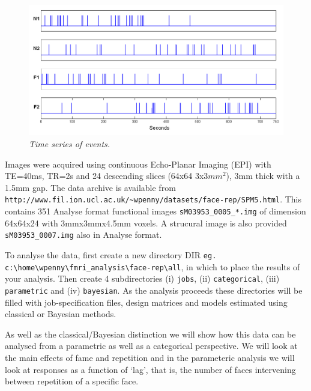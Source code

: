 \documentclass[a4paper,titlepage]{book}
\begin{document}
\begin{figure}
\begin{center}
\includegraphics[width=120mm]{faces/face_timing}
\caption{\em Time series of events. \label{face_timing}}
\end{center}
\end{figure}

Images were acquired using continuous Echo-Planar 
Imaging (EPI) with TE=40ms, TR=2s and 24 descending slices (64x64 3x3$mm^2$), 3mm thick with a 1.5mm gap.
The data archive is available from \verb!http://www.fil.ion.ucl.ac.uk/~wpenny/datasets/face-rep/SPM5.html!.
This contains 351 Analyse format functional images
\verb!sM03953_0005_*.img! of dimension 
64x64x24 with 3mmx3mmx4.5mm voxels. A strucural 
image is also provided \verb!sM03953_0007.img! also in Analyse format.

To analyse the data, first create a new directory DIR 
\newline \verb!eg. c:\home\wpenny\fmri_analysis\face-rep\all!, in which to place the results
of your analysis. Then create 4 subdirectories (i) \verb!jobs!, 
(ii)  \verb!categorical!, (iii)  \verb!parametric! and (iv) \verb!bayesian!. As the analysis 
proceeds these directories will be filled with job-specification files, design matrices 
and models estimated using classical or Bayesian 
methods. 

As well as the classical/Bayesian 
distinction we will show how this 
data can be analysed from a parametric as well as a categorical perspective. We will look at the 
main effects of fame and repetition and in the 
parameteric analysis we will look at 
responses as a function of `lag', that is, the number of faces intervening between repetition of a specific face.
\end{document}

